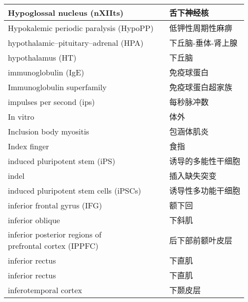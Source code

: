 \begin{longtable}{lll}
	\midrule
	Hypoglossal nucleus (nXIIts)    &&  舌下神经核  \\
	
	\midrule
	Hypokalemic periodic paralysis  (HypoPP)  &&  低钾性周期性麻痹  \\
	
	\midrule
	hypothalamic–pituitary–adrenal (HPA)     &&  下丘脑-垂体-肾上腺  \\
	
	\midrule
	hypothalamus (HT)     &&  下丘脑  \\
	
	\midrule
	immunoglobulin (IgE)   && 免疫球蛋白  \\
	
	\midrule
	Immunoglobulin superfamily   && 免疫球蛋白超家族  \\
	
	\midrule
	impulses per second (ips)   && 每秒脉冲数  \\
	
	\midrule
	In vitro   && 体外  \\
	
	\midrule
	Inclusion body myositis  && 包涵体肌炎  \\
	
	\midrule
	Index finger  && 食指  \\
	
	\midrule
	induced pluripotent stem (iPS)  && 诱导的多能性干细胞  \\
	
	\midrule
	indel   && 插入缺失突变  \\
	
	\midrule
	induced pluripotent stem cells (iPSCs)  && 诱导性多功能干细胞  \\
	
	\midrule
	inferior frontal gyrus (IFG)   && 额下回  \\
	
	\midrule
	inferior oblique   && 下斜肌  \\
	
	\midrule
	\makecell[l]{inferior posterior regions of \\ prefrontal cortex (IPPFC)}  && 后下部前额叶皮层  \\
	
	\midrule
	inferior rectus   && 下直肌  \\
	
	\midrule
	inferior rectus   && 下直肌  \\
	
	\midrule
	inferotemporal cortex   && 下颞皮层  \\
	

\end{longtable}
